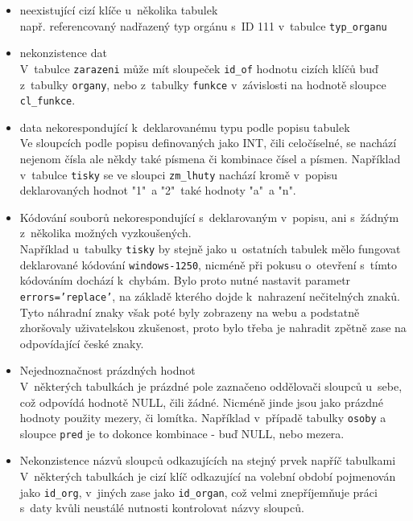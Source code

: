 \begin{itemize}
    \item neexistující cizí klíče u~několika tabulek\\
    např. referencovaný nadřazený typ orgánu s~ID 111 v~tabulce \texttt{typ\_organu}
    \item nekonzistence dat\\
    V~tabulce \texttt{zarazeni} může mít sloupeček \texttt{id\_of} hodnotu cizích klíčů buď z~tabulky \texttt{organy}, nebo z~tabulky \texttt{funkce} v~závislosti na hodnotě sloupce \texttt{cl\_funkce}.
    \item data nekorespondující k~deklarovanému typu podle popisu tabulek\\
    Ve sloupcích podle popisu definovaných jako INT, čili celočíselné, se nachází nejenom čísla ale někdy také písmena či kombinace čísel a písmen. Například v~tabulce \texttt{tisky} se ve sloupci \texttt{zm\_lhuty} nachází kromě v~popisu deklarovaných hodnot "1"\ a "2"\ také hodnoty "a"\ a "n".
    \item Kódování souborů nekorespondující s~deklarovaným v~popisu, ani s~žádným z~několika možných vyzkoušených.\\
    Například u~tabulky \texttt{tisky} by stejně jako u~ostatních tabulek mělo fungovat deklarované kódování \texttt{windows-1250}, nicméně při pokusu o~otevření s~tímto kódováním dochází k~chybám. Bylo proto nutné nastavit parametr \texttt{errors='replace'}, na základě kterého dojde k~nahrazení nečitelných znaků. Tyto náhradní znaky však poté byly zobrazeny na webu a podstatně zhoršovaly uživatelskou zkušenost, proto bylo třeba je nahradit zpětně zase na odpovídající české znaky.
    \item Nejednoznačnost prázdných hodnot\\
    V~některých tabulkách je prázdné pole zaznačeno oddělovači sloupců u~sebe, což odpovídá hodnotě NULL, čili žádné. Nicméně jinde jsou jako prázdné hodnoty použity mezery, či lomítka. Například v~případě tabulky \texttt{osoby} a sloupce \texttt{pred} je to dokonce kombinace - buď NULL, nebo mezera.
    \item Nekonzistence názvů sloupců odkazujících na stejný prvek napříč tabulkami\\
    V~některých tabulkách je cizí klíč odkazující na volební období pojmenován jako \texttt{id\_org}, v~jiných zase jako \texttt{id\_organ}, což velmi znepříjemňuje práci s~daty kvůli neustálé nutnosti kontrolovat názvy sloupců.
    
    
\end{itemize}

